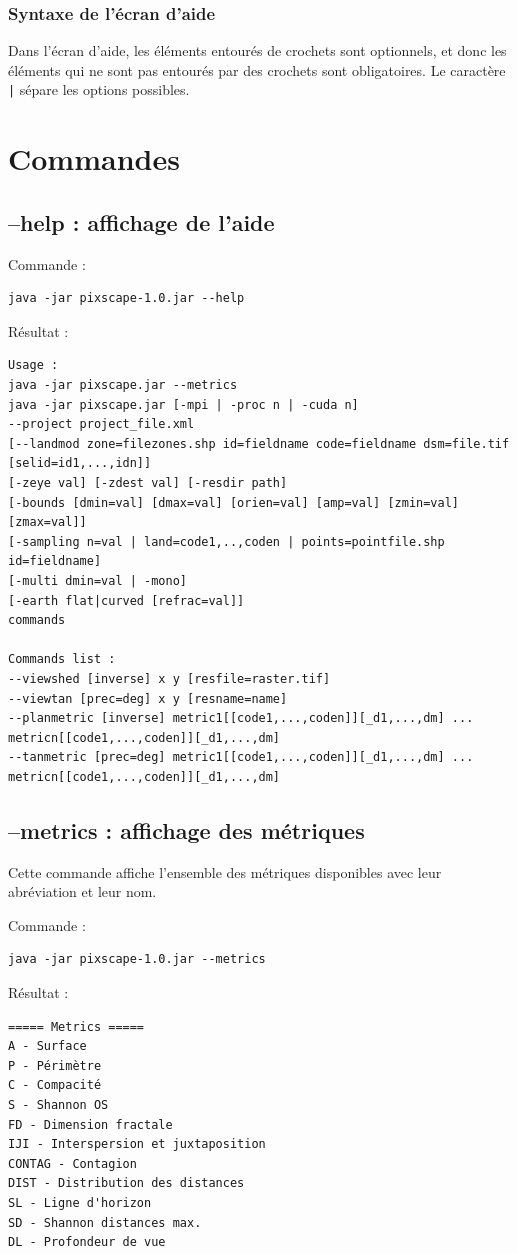 \documentclass{report}
\begin{document}
\subsubsection{Syntaxe de l'écran d'aide}
Dans l'écran d'aide, les éléments entourés de crochets sont optionnels, et donc les éléments qui ne sont pas entourés par des crochets sont obligatoires. Le caractère \verb+|+ sépare les options possibles.

\section{Commandes}

\subsection{--help : affichage de l'aide}
Commande :
\begin{Verbatim}
java -jar pixscape-1.0.jar --help
\end{Verbatim}
Résultat :
\begin{Verbatim}
Usage :
java -jar pixscape.jar --metrics
java -jar pixscape.jar [-mpi | -proc n | -cuda n]
--project project_file.xml
[--landmod zone=filezones.shp id=fieldname code=fieldname dsm=file.tif [selid=id1,...,idn]]
[-zeye val] [-zdest val] [-resdir path]
[-bounds [dmin=val] [dmax=val] [orien=val] [amp=val] [zmin=val] [zmax=val]]
[-sampling n=val | land=code1,..,coden | points=pointfile.shp id=fieldname]
[-multi dmin=val | -mono]
[-earth flat|curved [refrac=val]]
commands

Commands list :
--viewshed [inverse] x y [resfile=raster.tif]
--viewtan [prec=deg] x y [resname=name]
--planmetric [inverse] metric1[[code1,...,coden]][_d1,...,dm] ... metricn[[code1,...,coden]][_d1,...,dm]
--tanmetric [prec=deg] metric1[[code1,...,coden]][_d1,...,dm] ... metricn[[code1,...,coden]][_d1,...,dm]
\end{Verbatim}

\subsection{--metrics : affichage des métriques}
Cette commande affiche l'ensemble des métriques disponibles avec leur abréviation et leur nom. 

Commande :
\begin{Verbatim}
java -jar pixscape-1.0.jar --metrics
\end{Verbatim}
Résultat :
\begin{Verbatim}
===== Metrics =====
A - Surface
P - Périmètre
C - Compacité
S - Shannon OS
FD - Dimension fractale
IJI - Interspersion et juxtaposition
CONTAG - Contagion
DIST - Distribution des distances
SL - Ligne d'horizon
SD - Shannon distances max.
DL - Profondeur de vue
\end{Verbatim}
\end{document}
